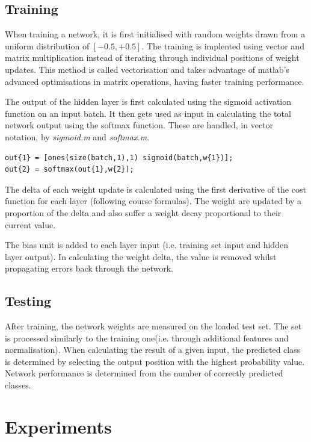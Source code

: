 \documentclass[11]{article}
\begin{document}
\subsection{Training}

When training a network, it is first initialised with random weights drawn from a uniform distribution of $[-0.5,+0.5]$. The training is implented using vector and matrix multiplication instead of iterating through individual positions of weight updates. This method is called vectorisation and takes advantage of matlab's advanced optimisations in matrix operations, having faster training performance.

The output of the hidden layer is first calculated using the sigmoid activation function on an input batch. It then gets used as input in calculating the total network output using the softmax function. These are handled, in vector notation, by \emph{sigmoid.m} and \emph{softmax.m}.
\begin{lstlisting}
out{1} = [ones(size(batch,1),1) sigmoid(batch,w{1})];
out{2} = softmax(out{1},w{2});
\end{lstlisting}

The delta of each weight update is calculated using the first derivative of the cost function for each layer (following course formulas). The weight are updated by a proportion of the delta and also suffer a weight decay proportional to their current value. 

The bias unit is added to each layer input (i.e. training set input and hidden layer output). In calculating the weight delta, the value is removed whilst propagating errors back through the network. 

\subsection{Testing}

After training, the network weights are measured on the loaded test set. The set is processed similarly to the training one(i.e. through additional features and normalisation). When calculating the result of a given input, the predicted class is determined by selecting the output position with the highest probability value. Network performance is determined from the number of correctly predicted classes. 

\section{Experiments}
\end{document}
